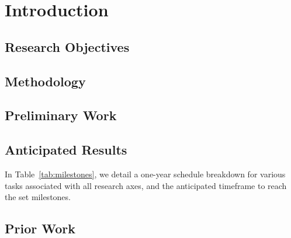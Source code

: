 \section{Introduction}


\subsection{Research Objectives}


\subsection{Methodology}


\subsection{Preliminary Work}


\subsection{Anticipated Results}
In Table~\ref{tab:milestones}, we detail a one-year schedule breakdown for various tasks associated with all research axes, and the anticipated timeframe to reach the set milestones.


\subsection{Prior Work}




